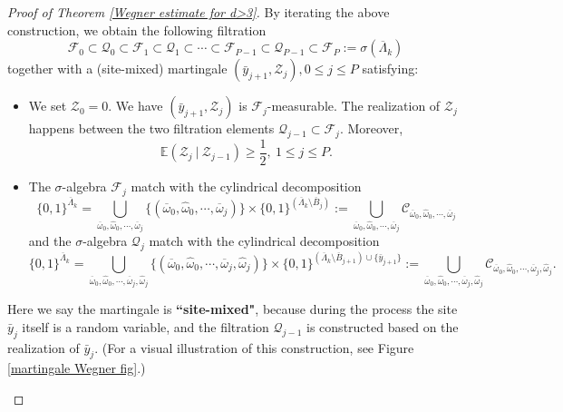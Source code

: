 \documentclass[11pt,reqno,UTF8,twoside]{amsart}
\newcommand{\E}{\mathbb{E}}
\newcommand{\barLambda}{\overline{\Lambda}}
\newcommand{\baromega}{\overline{\omega}}
\newcommand{\hatomega}{\widehat{\omega}}
\newcommand{\mcC}{\mathcal{C}}
\newcommand{\mcF}{\mathcal{F}}
\newcommand{\mcQ}{\mathcal{Q}}
\newcommand{\mcZ}{\mathcal{Z}}
\newcommand{\barB}{\overline{B}}
\theoremstyle{definition}
\numberwithin{equation}{section}
\begin{document}
\begin{proof}[Proof of Theorem \ref{Wegner estimate for d>3}]
By iterating the above construction, we obtain the following filtration
\[\mcF_0\subset \mcQ_0\subset \mcF_1\subset\mcQ_1\subset \cdots \subset \mcF_{P-1}\subset\mcQ_{P-1}\subset \mcF_{P}:=\sigma(\barLambda_k) \]
together with a (site-mixed) martingale $(\bar{y}_{j+1},\mcZ_j),0 \leq j\leq P$ satisfying:
\begin{itemize}
  \item We set $\mcZ_0=0$. We have  $(\bar{y}_{j+1},\mcZ_{j})$ is $\mcF_{j}$-measurable. The realization of $\mcZ_j$ happens between the two filtration elements $\mcQ_{j-1}\subset \mcF_j$. Moreover, 
        \begin{equation}\label{martingale expectation}
            \E(\mcZ_j\ | \ \mcZ_{j-1})\geq \frac{1}{2},\ 1\leq j\leq P.
        \end{equation}
  \item The $\sigma$-algebra $\mcF_j$ match with the cylindrical decomposition 
     \[ \{0,1\}^{\barLambda_k}=\bigcup_{\baromega_0,\hatomega_0,\cdots,\baromega_j} \{(\baromega_0,\hatomega_0,\cdots,\baromega_j)\}\times \{0,1\}^{(\barLambda_k\setminus \barB_j)}:= \bigcup_{\baromega_0,\hatomega_0,\cdots,\baromega_j}\mcC_{\baromega_0,\hatomega_0,\cdots,\baromega_j} \]
       and the $\sigma$-algebra $\mcQ_j$ match with the cylindrical decomposition
  \[ \{0,1\}^{\barLambda_k}=\bigcup_{\baromega_0,\hatomega_0,\cdots,\baromega_j,\hatomega_j} \{(\baromega_0,\hatomega_0,\cdots,\baromega_j,\hatomega_j)\}\times \{0,1\}^{(\barLambda_k\setminus \barB_{j+1})\cup \{\bar{y}_{j+1}\} } := \bigcup_{\baromega_0,\hatomega_0,\cdots,\baromega_j,\hatomega_j}\mcC_{\baromega_0,\hatomega_0,\cdots,\baromega_j,\hatomega_j}. \]     
\end{itemize}
Here we say the martingale is \textbf{``site-mixed"}, because during the process the site $\bar{y}_j$ itself is a random variable, and the filtration $\mcQ_{j-1}$ is constructed based on the realization of $\bar{y}_j$. (For a visual illustration of this construction, see Figure  \ref{martingale Wegner fig}.)



\begin{figure}[htbp]
  \centering



\begin{tikzpicture}[x=0.75pt,y=0.75pt,yscale=-0.9,xscale=0.9]


\end{tikzpicture}
\end{figure}
\end{proof}
\end{document}
